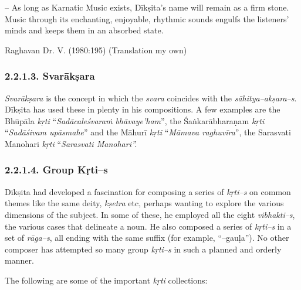 – As long as Karnatic Music exists, Dīkṣita’s name will remain as a firm stone. Music through its enchanting, enjoyable, rhythmic sounds engulfs the listeners’ minds and keeps them in an absorbed state.

\begin{flushright}
Raghavan Dr. V. (1980:195) (Translation my own)
\end{flushright}


\subsubsection*{2.2.1.3. Svarākṣara}

\textit{Svarākṣara} is the concept in which the \textit{svara} coincides with the \textit{sāhitya–akṣara–s}. Dīkṣita has used these in plenty in his compositions. A few examples are the Bhūpāla \textit{kṛti} “\textit{Sadācaleśvaraṁ bhāvaye’ham}”, the Śaṅkarābharaṇam \textit{kṛti} “\textit{Sadāśivam upāsmahe}” and the Māhurī \textit{kṛti} “\textit{Māmava raghuvīra}”, the Sarasvati Manohari \textit{kṛti} “\textit{Sarasvati Manohari”.}


\subsubsection*{2.2.1.4. Group Kṛti–s}

Dīkṣita had developed a fascination for composing a series of \textit{kṛti–s} on common themes like the same deity, \textit{kṣetra} etc, perhaps wanting to explore the various dimensions of the subject. In some of these, he employed all the eight \textit{vibhakti–s}, the various cases that delineate a noun. He also composed a series of \textit{kṛti–s} in a set of \textit{rāga–s}, all ending with the same suffix (for example, “–gauḷa”). No other composer has attempted so many group \textit{kṛti–s} in such a planned and orderly manner.

The following are some of the important \textit{kṛti} collections:


